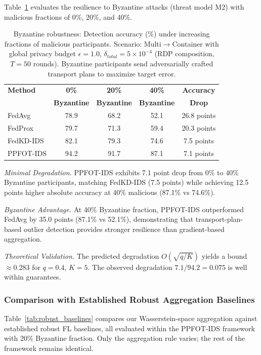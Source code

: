 \documentclass{ieeeaccess}
\theoremstyle{plain}
\theoremstyle{definition}
\theoremstyle{remark}
\begin{document}
Table~\ref{tab:byzantine} evaluates the resilience to Byzantine attacks (threat model M2) with malicious fractions of 0\%, 20\%, and 40\%.

\begin{table}[!t]
\renewcommand{\arraystretch}{1.3}
\caption{Byzantine robustness: Detection accuracy (\%) under increasing fractions of malicious participants. Scenario: Multi$\to$Container with global privacy budget $\epsilon = 1.0$, $\delta_{total} = 5 \times 10^{-4}$ (RDP composition, $T = 50$ rounds). Byzantine participants send adversarially crafted transport plans to maximize target error.}
\label{tab:byzantine}
\centering
\begin{tabular}{lcccc}
\hline
\textbf{Method} & \textbf{0\%} & \textbf{20\%} & \textbf{40\%} & \textbf{Accuracy} \\
 & \textbf{Byzantine} & \textbf{Byzantine} & \textbf{Byzantine} & \textbf{Drop} \\
\hline
FedAvg & 78.9 & 68.2 & 52.1 & 26.8 points \\
FedProx & 79.7 & 71.3 & 59.4 & 20.3 points \\
FedKD-IDS & 82.1 & 79.3 & 74.6 & 7.5 points \\
PPFOT-IDS & 94.2 & 91.7 & 87.1 & 7.1 points \\
\hline
\end{tabular}
\end{table}

\textit{Minimal Degradation.} PPFOT-IDS exhibits 7.1 point drop from 0\% to 40\% Byzantine participants, matching FedKD-IDS (7.5 points) while achieving 12.5 points higher absolute accuracy at 40\% malicious (87.1\% vs 74.6\%).

\textit{Byzantine Advantage.} At 40\% Byzantine fraction, PPFOT-IDS outperformed FedAvg by 35.0 points (87.1\% vs 52.1\%), demonstrating that transport-plan-based outlier detection provides stronger resilience than gradient-based aggregation.

\textit{Theoretical Validation.} The predicted degradation $O(\sqrt{q/K})$ yields a bound $\approx 0.283$ for $q = 0.4$, $K = 5$. The observed degradation $7.1/94.2 = 0.075$ is well within guarantees.

\subsubsection{Comparison with Established Robust Aggregation Baselines}
\label{sec:robust_baselines}

Table~\ref{tab:robust_baselines} compares our Wasserstein-space aggregation against established robust FL baselines, all evaluated within the PPFOT-IDS framework with 20\% Byzantine fraction. Only the aggregation rule varies; the rest of the framework remains identical.
\end{document}
